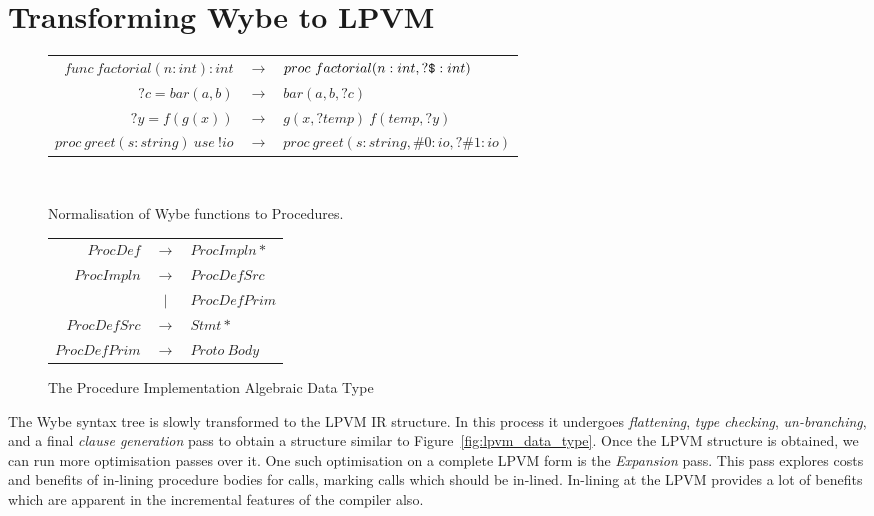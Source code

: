 \chapter{Transforming Wybe to LPVM}
\label{chap:wybe_to_lpvm}

\begin{figure}
  \centering
  \begin{tabular}{r c l}

    \( func\ factorial(n:int):int \) & \(\rightarrow \) & 
                                                          \( proc\ factorial(n:int, ?\verb+$+:int) \) \\
    \( ?c = bar(a, b) \) & \(\rightarrow\) & \( bar(a, b, ?c) \) \\
    \( ?y = f(g(x)) \) & \(\rightarrow\) & \( g(x, ?temp)\ f(temp, ?y) \) \\
    \( proc\ greet(s:string)\ use\ !io \) & \(\rightarrow\) &
                                                           \( proc\
                                                           greet(s:string,
                                                           \#0:io, ?\#1:io) \)


  \end{tabular}
  \\
  \caption{Normalisation of Wybe functions to Procedures.}
  \label{fig:wybe_convert_to_proc}
\end{figure}



\begin{figure}
  \centering
  \begin{tabular}{r c l}
    \( ProcDef \)     & \( \rightarrow \) & \( ProcImpln* \)   \\
    \( ProcImpln \)   & \( \rightarrow \) & \( ProcDefSrc \)   \\
                      & \( \rvert \)        & \( ProcDefPrim \)  \\
    \( ProcDefSrc \)  & \( \rightarrow \) & \( Stmt* \)        \\
    \( ProcDefPrim \) & \( \rightarrow \) & \( Proto\ Body \)  \\
  \end{tabular}
  \caption{The Procedure Implementation Algebraic Data Type}
  \label{fig:proc_impln}
\end{figure}



The Wybe syntax tree is slowly transformed to the LPVM IR structure. In this
process it undergoes \textit{flattening}, \textit{type checking},
\textit{un-branching}, and a final \textit{clause generation} pass to obtain a structure
similar to Figure~\ref{fig:lpvm_data_type}. Once the LPVM structure is
obtained, we can run more optimisation passes over it. One such optimisation on
a complete LPVM form is the \textit{Expansion} pass. This pass explores costs
and benefits of in-lining procedure bodies for calls, marking calls which
should be in-lined. In-lining at the LPVM provides a lot of benefits which are
apparent in the incremental features of the compiler also.

